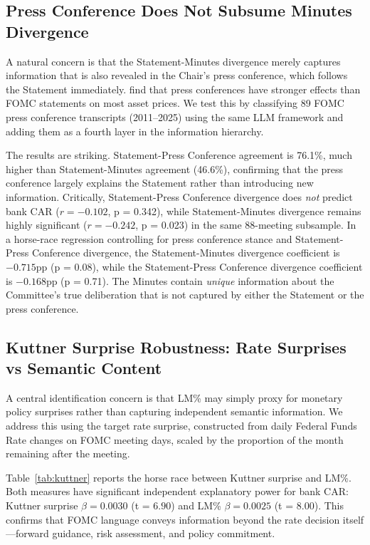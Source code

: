 \documentclass[12pt,a4paper]{article}
\begin{document}
\subsection{Press Conference Does Not Subsume Minutes Divergence}

A natural concern is that the Statement-Minutes divergence merely captures information that is also revealed in the Chair's press conference, which follows the Statement immediately. \citet{Bauer2025} find that press conferences have stronger effects than FOMC statements on most asset prices. We test this by classifying 89 FOMC press conference transcripts (2011--2025) using the same LLM framework and adding them as a fourth layer in the information hierarchy.

The results are striking. Statement-Press Conference agreement is 76.1\%, much higher than Statement-Minutes agreement (46.6\%), confirming that the press conference largely explains the Statement rather than introducing new information. Critically, Statement-Press Conference divergence does \textit{not} predict bank CAR ($r = -0.102$, p = 0.342), while Statement-Minutes divergence remains highly significant ($r = -0.242$, p = 0.023) in the same 88-meeting subsample. In a horse-race regression controlling for press conference stance and Statement-Press Conference divergence, the Statement-Minutes divergence coefficient is $-0.715$pp (p = 0.08), while the Statement-Press Conference divergence coefficient is $-0.168$pp (p = 0.71). The Minutes contain \textit{unique} information about the Committee's true deliberation that is not captured by either the Statement or the press conference.

\subsection{Kuttner Surprise Robustness: Rate Surprises vs Semantic Content}

A central identification concern is that LM\% may simply proxy for monetary policy surprises rather than capturing independent semantic information. We address this using the \citet{Kuttner2001} target rate surprise, constructed from daily Federal Funds Rate changes on FOMC meeting days, scaled by the proportion of the month remaining after the meeting.

Table~\ref{tab:kuttner} reports the horse race between Kuttner surprise and LM\%. Both measures have significant independent explanatory power for bank CAR: Kuttner surprise $\beta = 0.0030$ (t = $6.90$) and LM\% $\beta = 0.0025$ (t = $8.00$). This confirms that FOMC language conveys information beyond the rate decision itself---forward guidance, risk assessment, and policy commitment.
\end{document}
